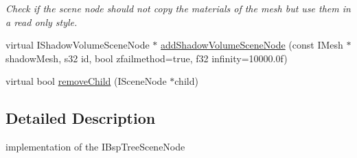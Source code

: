 \begin{DoxyCompactItemize}
\begin{DoxyCompactList}\small\item\em Check if the scene node should not copy the materials of the mesh but use them in a read only style. \end{DoxyCompactList}\item 
virtual I\-Shadow\-Volume\-Scene\-Node $\ast$ \hyperlink{classirr_1_1scene_1_1_c_octree_scene_node_a49004b0e16ba6b4fe14cc3398fde0242}{add\-Shadow\-Volume\-Scene\-Node} (const I\-Mesh $\ast$shadow\-Mesh, s32 id, bool zfailmethod=true, f32 infinity=10000.\-0f)
\item 
virtual bool \hyperlink{classirr_1_1scene_1_1_c_octree_scene_node_ac6efdbcccf035f633b750d38ed88e869}{remove\-Child} (I\-Scene\-Node $\ast$child)
\end{DoxyCompactItemize}


\subsection{Detailed Description}
implementation of the I\-Bsp\-Tree\-Scene\-Node 

